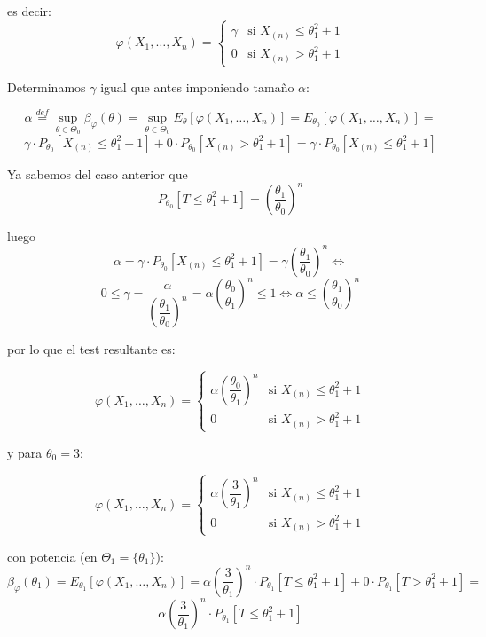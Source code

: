 \documentclass[12pt]{article}
\begin{document}
\begin{ejercicio}
        es decir:
        $$\varphi(X_1, \ldots, X_n) = \begin{cases}
            \gamma &\text{si } X_{(n)} \leq \theta_1^2 + 1 \\
            0 &\text{si } X_{(n)} > \theta_1^2 + 1
        \end{cases}$$

        Determinamos $\gamma$ igual que antes imponiendo tamaño $\alpha$:

        $$\alpha \stackrel{def} = \sup_{\theta \in \Theta_0} \beta_{\varphi}(\theta) =  \sup_{\theta \in \Theta_0} E_\theta[\varphi(X_1, \ldots, X_n)] = E_{\theta_0}[\varphi(X_1, \ldots, X_n)] = $$
        $$\gamma \cdot P_{\theta_0}[X_{(n)} \leq \theta_1^2 + 1] + 0 \cdot P_{\theta_0}[X_{(n)} > \theta_1^2 + 1] = \gamma \cdot P_{\theta_0}[X_{(n)} \leq \theta_1^2 + 1] $$

        Ya sabemos del caso anterior que 
        $$P_{\theta_0}[T \leq \theta_1^2 + 1] = \left( \dfrac{\theta_1}{\theta_0} \right)^{n}$$

        luego
        $$\alpha = \gamma \cdot P_{\theta_0}[X_{(n)} \leq \theta_1^2 + 1] = \gamma \left( \dfrac{\theta_1}{\theta_0} \right)^{n} \iff $$
        $$0 \leq \gamma = \dfrac{\alpha}{\left( \dfrac{\theta_1}{\theta_0} \right)^{n}} = \alpha \left( \dfrac{\theta_0}{\theta_1} \right)^{n}  \leq 1 \iff \alpha \leq \left( \dfrac{\theta_1}{\theta_0} \right)^{n}$$

        por lo que el test resultante es:

        $$\varphi(X_1, \ldots, X_n) = 
            \begin{cases}
                \alpha \left( \dfrac{\theta_0}{\theta_1} \right)^{n} &\text{si } X_{(n)} \leq \theta_1^2 + 1 \\
                0 &\text{si } X_{(n)} > \theta_1^2 + 1
            \end{cases}$$      

        y para $\theta_0 = 3$:

        $$\varphi(X_1, \ldots, X_n) = 
            \begin{cases}
                \alpha \left( \dfrac{3}{\theta_1} \right)^{n} &\text{si } X_{(n)} \leq \theta_1^2 + 1 \\
                0 &\text{si } X_{(n)} > \theta_1^2 + 1
            \end{cases}$$ 
            
        con potencia (en $\Theta_1 = \{\theta_1\}$):
        $$\beta_{\varphi}(\theta_1) = E_{\theta_1}[\varphi(X_1, \ldots, X_n)] = \alpha \left( \dfrac{3}{\theta_1} \right)^{n} \cdot P_{\theta_1}[T \leq \theta_1^2 + 1] + 
        0 \cdot P_{\theta_1}[T > \theta_1^2 + 1] = $$
        $$\alpha \left( \dfrac{3}{\theta_1} \right)^{n} \cdot P_{\theta_1}[T \leq \theta_1^2 + 1]$$


\end{ejercicio}
\end{document}
